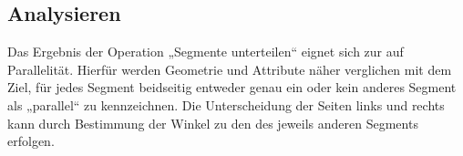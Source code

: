 \documentclass[../main/thesis.tex]{subfiles}
\begin{document}
\subsection{Analysieren}
\label{ch:analyse-algorithm}

Das Ergebnis der Operation „Segmente unterteilen“ eignet sich zur  auf Parallelität.
Hierfür werden Geometrie und Attribute näher verglichen mit dem Ziel, für jedes Segment beidseitig entweder genau ein oder kein anderes Segment als „parallel“ zu kennzeichnen.
%
Die Unterscheidung der Seiten links und rechts kann durch Bestimmung der Winkel zu den  des jeweils anderen Segments erfolgen.

\end{document}
